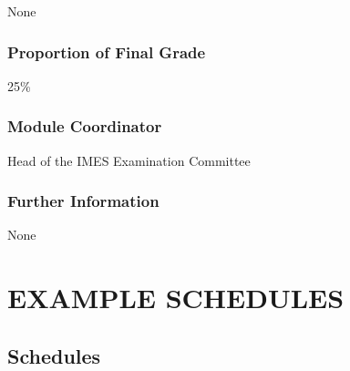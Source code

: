\documentclass[
  letterpaper,
  10pt,
  openany]{book}
\begin{document}

None

\section*{Proportion of Final Grade}\label{proportion-of-final-grade-7}


25\%

\section*{Module Coordinator}\label{module-coordinator-7}


Head of the IMES Examination Committee

\section*{Further Information}\label{further-information-7}


None

\part{EXAMPLE SCHEDULES}

\chapter*{Schedules}\label{schedules}



\backmatter
\end{document}
